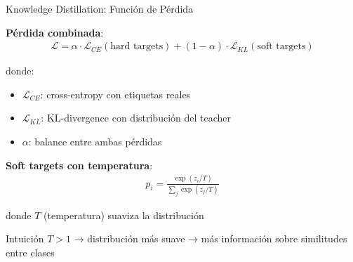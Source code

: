 \begin{frame}{Knowledge Distillation: Función de Pérdida}

\textbf{Pérdida combinada}:
\begin{align*}
\mathcal{L} = \alpha \cdot \mathcal{L}_{CE}(\text{hard targets}) + (1-\alpha) \cdot \mathcal{L}_{KL}(\text{soft targets})
\end{align*}

donde:
\begin{itemize}
    \item $\mathcal{L}_{CE}$: cross-entropy con etiquetas reales
    \item $\mathcal{L}_{KL}$: KL-divergence con distribución del teacher
    \item $\alpha$: balance entre ambas pérdidas
\end{itemize}

\vspace{0.5em}

\textbf{Soft targets con temperatura}:
\begin{align*}
p_i = \frac{\exp(z_i / T)}{\sum_j \exp(z_j / T)}
\end{align*}

donde $T$ (temperatura) suaviza la distribución

\vspace{0.5em}

\begin{block}{Intuición}
$T > 1$ → distribución más suave → más información sobre similitudes entre clases
\end{block}

\end{frame}

